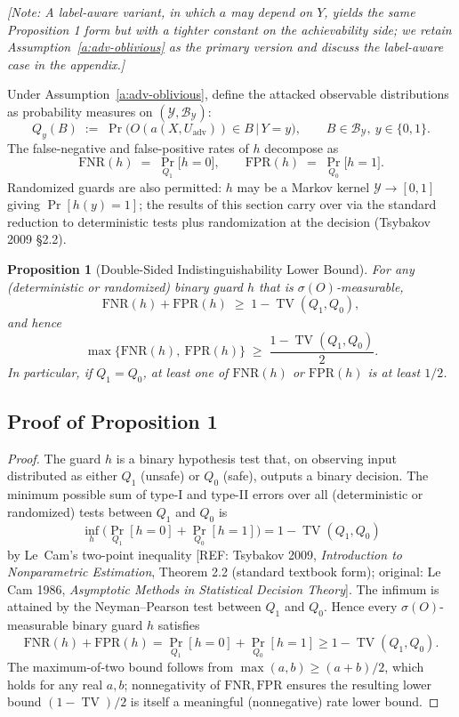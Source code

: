 \documentclass[11pt]{article}
\newcommand{\REF}[1]{{\color{teal}\textsf{[REF: #1]}}}
\newcommand{\NOTE}[1]{{\color{blue}\textit{[Note: #1]}}}
\theoremstyle{plain}
\newtheorem{proposition}{Proposition}
\theoremstyle{definition}
\DeclareMathOperator{\TV}{TV}
\begin{document}
\NOTE{A label-aware variant, in which $a$ may depend on $Y$, yields the same Proposition 1 form but with a tighter constant on the achievability side; we retain Assumption~\ref{a:adv-oblivious} as the primary version and discuss the label-aware case in the appendix.}

Under Assumption~\ref{a:adv-oblivious}, define the attacked observable distributions as probability measures on $(\mathcal{Y}, \mathcal{B}_\mathcal{Y})$:
\[
Q_y(B) \;:=\; \Pr\!\big(O(a(X, U_{\mathrm{adv}})) \in B \,\big|\, Y = y\big),
\qquad B \in \mathcal{B}_\mathcal{Y},\ y \in \{0, 1\}.
\]
The false-negative and false-positive rates of $h$ decompose as
\[
\mathrm{FNR}(h) \;=\; \Pr_{Q_1}\!\big[h = 0\big],
\qquad
\mathrm{FPR}(h) \;=\; \Pr_{Q_0}\!\big[h = 1\big].
\]
Randomized guards are also permitted: $h$ may be a Markov kernel $\mathcal{Y} \to [0,1]$ giving $\Pr[h(y) = 1]$; the results of this section carry over via the standard reduction to deterministic tests plus randomization at the decision (Tsybakov 2009 \S 2.2).

\begin{proposition}[Double-Sided Indistinguishability Lower Bound]\label{prop:1}
For any (deterministic or randomized) binary guard $h$ that is $\sigma(O)$-measurable,
\[
\mathrm{FNR}(h) + \mathrm{FPR}(h) \;\ge\; 1 - \TV(Q_1, Q_0),
\]
and hence
\[
\max\!\big\{\mathrm{FNR}(h),\ \mathrm{FPR}(h)\big\} \;\ge\; \frac{1 - \TV(Q_1, Q_0)}{2}.
\]
In particular, if $Q_1 = Q_0$, at least one of $\mathrm{FNR}(h)$ or $\mathrm{FPR}(h)$ is at least $1/2$.
\end{proposition}

\subsection{Proof of Proposition 1}

\begin{proof}
The guard $h$ is a binary hypothesis test that, on observing input distributed as either $Q_1$ (unsafe)
or $Q_0$ (safe), outputs a binary decision. The minimum possible sum of type-I and type-II errors over all
(deterministic or randomized) tests between $Q_1$ and $Q_0$ is
\[
\inf_h \Big(\Pr_{Q_1}[h = 0] + \Pr_{Q_0}[h = 1]\Big) = 1 - \TV(Q_1, Q_0)
\]
by Le~Cam's two-point inequality \REF{Tsybakov 2009, \emph{Introduction to Nonparametric Estimation}, Theorem 2.2 (standard textbook form); original: Le Cam 1986, \emph{Asymptotic Methods in Statistical Decision Theory}}. The infimum is attained by the Neyman--Pearson test between $Q_1$ and $Q_0$. Hence every $\sigma(O)$-measurable binary guard $h$ satisfies
\[
\mathrm{FNR}(h) + \mathrm{FPR}(h) = \Pr_{Q_1}[h = 0] + \Pr_{Q_0}[h = 1] \ge 1 - \TV(Q_1, Q_0).
\]
The maximum-of-two bound follows from $\max(a, b) \ge (a + b)/2$, which holds for any real $a, b$; nonnegativity of $\mathrm{FNR}, \mathrm{FPR}$ ensures the resulting lower bound $(1 - \TV)/2$ is itself a meaningful (nonnegative) rate lower bound.
\end{proof}
\end{document}
